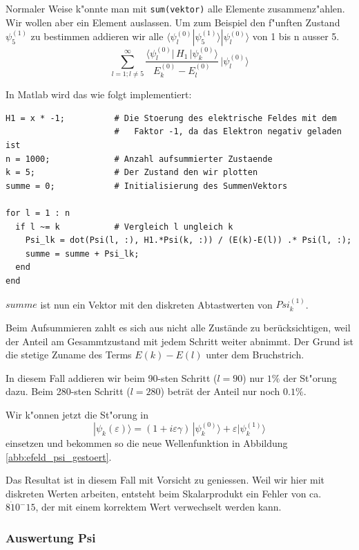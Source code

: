 \begin{refsection}
Normaler Weise k"onnte man mit \verb|sum(vektor)| alle Elemente zusammenz"ahlen.
Wir wollen aber ein Element auslassen.
Um zum Beispiel den f"unften Zustand $\psi_5^{(1)}$ zu bestimmen addieren wir alle 
$\langle\psi_l^{(0)}|\psi_5^{(1)}\rangle|\psi_l^{(0)}\rangle$
 von 1 bis n ausser 5.
\begin{equation}
  \sum_{l=1 ; l\ne 5}^{\infty}
    \frac{\langle \psi_l^{(0)}|\, H_1 \,|\psi_k^{(0)}\rangle}{E_k^{(0)}-E_l^{(0)}}
        \,
    |\psi_l^{(0)}\rangle
\end{equation}

In Matlab wird das wie folgt implementiert:
\begin{lstlisting}[style=Matlab]
H1 = x * -1;          # Die Stoerung des elektrische Feldes mit dem
                      #   Faktor -1, da das Elektron negativ geladen ist
n = 1000;             # Anzahl aufsummierter Zustaende
k = 5;                # Der Zustand den wir plotten
summe = 0;            # Initialisierung des SummenVektors

for l = 1 : n
  if l ~= k           # Vergleich l ungleich k
    Psi_lk = dot(Psi(l, :), H1.*Psi(k, :)) / (E(k)-E(l)) .* Psi(l, :);
    summe = summe + Psi_lk;
  end
end
\end{lstlisting}
$summe$ ist nun ein Vektor mit den diskreten Abtastwerten von $Psi_k^{(1)}$.

Beim Aufsummieren zahlt es sich aus nicht alle Zust\"ande zu ber\"ucksichtigen, weil der Anteil am Gesammtzustand 
mit jedem Schritt weiter abnimmt. Der Grund ist die stetige Zuname des Terms $E(k)-E(l)$ unter dem Bruchstrich.

In diesem Fall addieren wir beim 90-sten Schritt ($l=90$) nur $1\%$ der St"orung dazu.
Beim 280-sten Schritt ($l=280$) betr\"at der Anteil nur noch $0.1\%$.

Wir k"onnen jetzt die St"orung in 
\begin{equation}
|\psi_k(\varepsilon)\rangle
=
(1+i\varepsilon \gamma)
\,|\psi_k^{(0)}\rangle
+
\varepsilon|\psi_k^{(1)}\rangle
\end{equation}
einsetzen und bekommen so die neue Wellenfunktion in Abbildung \ref{abb:efeld_psi_gestoert}.

Das Resultat ist in diesem Fall mit Vorsicht zu geniessen.
Weil wir hier mit diskreten Werten arbeiten, entsteht beim Skalarprodukt ein Fehler von ca. $8\dot 10^-15$,
der mit einem korrektem Wert verwechselt werden kann.


\subsubsection{Auswertung Psi}


\end{refsection}
